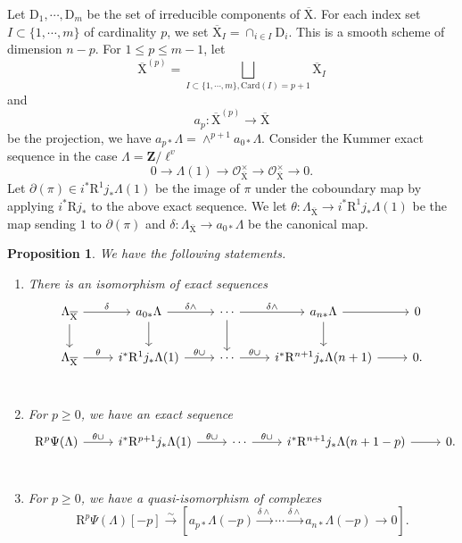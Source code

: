 \documentclass[10pt]{amsart}
\newcommand*\Z{\mathds{Z}}
\newcommand*\ZZ{|[draw,circle]| \Z_2}
\numberwithin{equation}{section}
\theoremstyle{plain}
\newtheorem{proposition}[theorem]{Proposition}
\numberwithin{equation}{section}
\theoremstyle{definition}
\theoremstyle{remark}
\def\calO{\mathcal{O}}
\def\ZZ{\mathbf{Z}}
\def\rmD{\mathrm{D}}
\def\rmX{\mathrm{X}}
\def\rmXbar{\overline{\rmX}}
\def\rmR{\mathrm{R}}
\begin{document}
Let $\rmD_{1},\cdots, \rmD_{m} $ be the set of irreducible components of $\overline{\rmX}$. For each index set $I\subset \{1, \cdots, m\}$ of cardinality $p$, we set $\overline{\rmX}_{I}=\cap_{i\in I} \rmD_{i}$. This is a smooth scheme of dimension $n-p$. For $1\leq p \leq m-1$, let
\begin{equation}
\overline{\rmX}^{(p)}=\bigsqcup_{I\subset \{1, \cdots, m\}, \mathrm{Card}(I)=p+1} \overline{\rmX}_{I}
\end{equation}
 and 
 \begin{equation}
 a_{p}: \overline{\rmX}^{(p)}\rightarrow \overline{\rmX}
 \end{equation}
 be the projection, we have $a_{p *}\Lambda=\wedge^{p+1}a_{0 *}\Lambda$. Consider the Kummer exact sequence in the case $\Lambda=\ZZ/\ell^{v}$
 \begin{equation}
 0\rightarrow \Lambda(1)\rightarrow \calO^{\times}_{\overline{\rmX}} \rightarrow \calO^{\times}_{\overline{\rmX}}\rightarrow 0.
 \end{equation}
 Let $\partial(\pi)\in i^{*}\rmR^{1}j_{*}\Lambda(1) $ be the image of $\pi$ under the coboundary map by applying $i^{*}\rmR j_{*}$ to the above exact sequence. We let $\theta: \Lambda_{\rmXbar}\rightarrow i^{*}\rmR^{1}j_{*}\Lambda(1)$ be the map sending $1$ to $\partial(\pi)$ and $\delta:\Lambda_{\rmXbar}\rightarrow a_{0*}\Lambda$ be the canonical map. 
\begin{proposition}\label{nearby-cycle-q}
We have the following statements.
\begin{enumerate}
\item There is an isomorphism of exact sequences 
\begin{equation*}
\begin{tikzcd}
\Lambda_{\rmXbar}\arrow{r}{\delta}\arrow{d}&a_{0*}\Lambda\arrow{r}{\delta\wedge}\arrow{d}&\cdots\arrow{r}{\delta\wedge}\arrow{d}&a_{n*}\Lambda\arrow{r}\arrow{d}&0\\
\Lambda_{\rmXbar}\arrow{r}{\theta}&i^{*}\rmR^{1}j_{*}\Lambda(1)\arrow{r}{\theta\cup}&\cdots\arrow{r}{\theta\cup}&i^{*}\rmR^{n+1}j_{*}\Lambda(n+1)\arrow{r}&0.\\
\end{tikzcd}
\end{equation*}
\item For $p\geq 0$, we have an exact sequence
\begin{equation*}
\begin{tikzcd}
\rmR^{p}\Psi(\Lambda)\arrow{r}{\theta\cup}&i^{*}\rmR^{p+1}j_{*}\Lambda(1)\arrow{r}{\theta\cup}&\cdots\arrow{r}{\theta\cup}&i^{*}\rmR^{n+1}j_{*}\Lambda(n+1-p)\arrow{r}&0.\\
\end{tikzcd}
\end{equation*}
\item For $p\geq 0$, we have a quasi-isomorphism of complexes
\begin{equation*}
\rmR^{p}\Psi(\Lambda)[-p]\xrightarrow{\sim} [a_{p*}\Lambda(-p)\xrightarrow{\delta\wedge}\cdots\xrightarrow{\delta\wedge} a_{n*}\Lambda(-p)\rightarrow0].
\end{equation*}
\end{enumerate}
\end{proposition}
\end{document}

